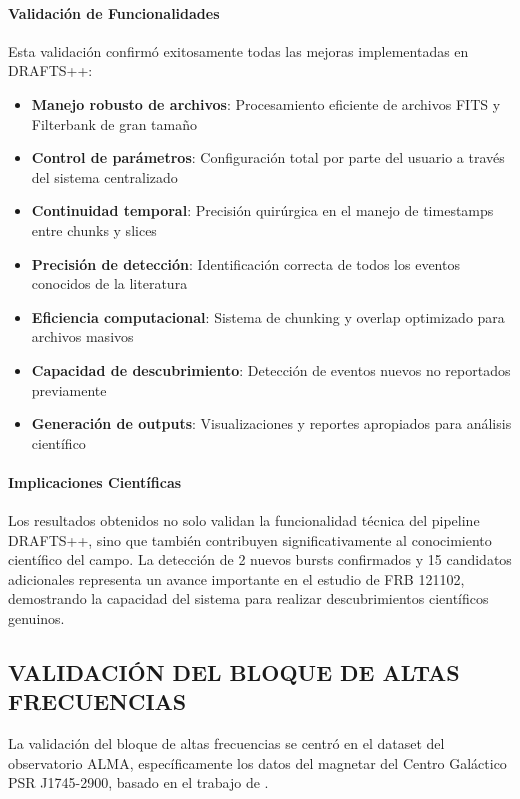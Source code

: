 \paragraph{Validación de Funcionalidades}

Esta validación confirmó exitosamente todas las mejoras implementadas en DRAFTS++:

\begin{itemize}
    \item \textbf{Manejo robusto de archivos}: Procesamiento eficiente de archivos FITS y Filterbank de gran tamaño
    \item \textbf{Control de parámetros}: Configuración total por parte del usuario a través del sistema centralizado
    \item \textbf{Continuidad temporal}: Precisión quirúrgica en el manejo de timestamps entre chunks y slices
    \item \textbf{Precisión de detección}: Identificación correcta de todos los eventos conocidos de la literatura
    \item \textbf{Eficiencia computacional}: Sistema de chunking y overlap optimizado para archivos masivos
    \item \textbf{Capacidad de descubrimiento}: Detección de eventos nuevos no reportados previamente
    \item \textbf{Generación de outputs}: Visualizaciones y reportes apropiados para análisis científico
\end{itemize}

\paragraph{Implicaciones Científicas}

Los resultados obtenidos no solo validan la funcionalidad técnica del pipeline DRAFTS++, sino que también contribuyen significativamente al conocimiento científico del campo. La detección de 2 nuevos bursts confirmados y 15 candidatos adicionales representa un avance importante en el estudio de FRB 121102, demostrando la capacidad del sistema para realizar descubrimientos científicos genuinos.

\subsection{VALIDACIÓN DEL BLOQUE DE ALTAS FRECUENCIAS}

La validación del bloque de altas frecuencias se centró en el dataset del observatorio ALMA, específicamente los datos del magnetar del Centro Galáctico PSR J1745-2900, basado en el trabajo de \cite{veracasanova2025}.

